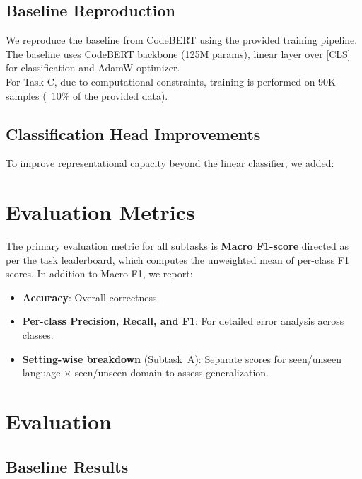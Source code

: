 \documentclass[11pt]{article}
\begin{document}
\subsection{Baseline Reproduction}
We reproduce the baseline from CodeBERT using the provided training pipeline.
\\
The baseline uses CodeBERT backbone (125M params), linear layer over [CLS] for classification and AdamW optimizer. \\
For Task C, due to computational constraints, training is performed on 90K samples (~10\% of the provided data).
\subsection{Classification Head Improvements}
To improve representational capacity beyond the linear classifier, we added: \\

\section{Evaluation Metrics}
\label{sec:metrics}

The primary evaluation metric for all subtasks is \textbf{Macro F1-score} directed as per the task leaderboard, which computes the unweighted mean of per-class F1 scores.
In addition to Macro F1, we report:
\begin{itemize}
    \item \textbf{Accuracy}: Overall correctness.
    \item \textbf{Per-class Precision, Recall, and F1}: For detailed error analysis across classes.
    \item \textbf{Setting-wise breakdown} (Subtask~A): Separate scores for seen/unseen language $\times$ seen/unseen domain to assess generalization.
\end{itemize}

\section{Evaluation}
\label{sec:results}

\subsection{Baseline Results}
\end{document}
